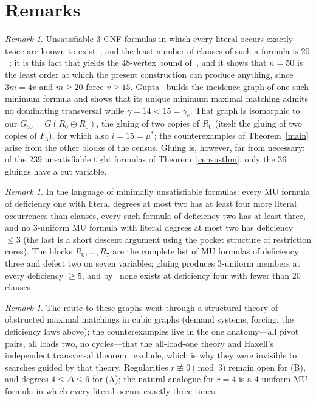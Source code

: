 \documentclass[11pt]{article}
\theoremstyle{remark}\newtheorem{remark}[theorem]{Remark}
\begin{document}
\section{Remarks}
\begin{remark}\label{gupta}
Unsatisfiable $3$-CNF formulas in which every literal occurs exactly twice are known to exist~\cite{BKS,BKS2}, and the least number of clauses of such a formula is $20$~\cite{ZPS}; it is this fact that yields the $48$-vertex bound of~\cite[Prop.~7]{Gupta}, and it shows that $n=50$ is the least order at which the present construction can produce anything, since $3m=4v$ and $m\ge20$ force $v\ge15$. Gupta~\cite[Thm.~2]{Gupta} builds the incidence graph of one such minimum formula and shows that its unique minimum maximal matching admits no dominating transversal while $\gamma=14<15=\gamma_e$. That graph is isomorphic to our $G_{50}=G(R_0\oplus R_0)$, the gluing of two copies of $R_0$ (itself the gluing of two copies of $F_3$), for which also $i=15=\mu^*$; the counterexamples of Theorem~\ref{main} arise from the other blocks of the census. Gluing is, however, far from necessary: of the $239$ unsatisfiable tight formulas of Theorem~\ref{censusthm}, only the $36$ gluings have a cut variable.
\end{remark}
\begin{remark}
In the language of minimally unsatisfiable formulas: every MU formula of deficiency one with literal degrees at most two has at least four more literal occurrences than clauses, every such formula of deficiency two has at least three, and no $3$-uniform MU formula with literal degrees at most two has deficiency $\le3$ (the last is a short descent argument using the pocket structure of restriction cores). The blocks $R_0,\dots,R_7$ are the complete list of MU formulas of deficiency three and defect two on seven variables; gluing produces $3$-uniform members at every deficiency $\ge5$, and by~\cite{ZPS} none exists at deficiency four with fewer than $20$ clauses.
\end{remark}
\begin{remark}
The route to these graphs went through a structural theory of obstructed maximal matchings in cubic graphs (demand systems, forcing, the deficiency laws above); the counterexamples live in the one anatomy---all pivot pairs, all loads two, no cycles---that the all-load-one theory and Haxell's independent transversal theorem~\cite{Haxell} exclude, which is why they were invisible to searches guided by that theory. Regularities $r\not\equiv0\pmod3$ remain open for (B), and degrees $4\le\Delta\le6$ for (A); the natural analogue for $r=4$ is a $4$-uniform MU formula in which every literal occurs exactly three times.
\end{remark}
\appendix
\end{document}
